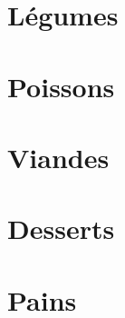 \documentclass[twosides, 11pt]{book}
\begin{document}


\maketitle
\tableofcontents

\chapter{Légumes}


\chapter{Poissons}



\chapter{Viandes}




\chapter{Desserts}









\chapter{Pains}




\clearpage
\printindex
\end{document}
